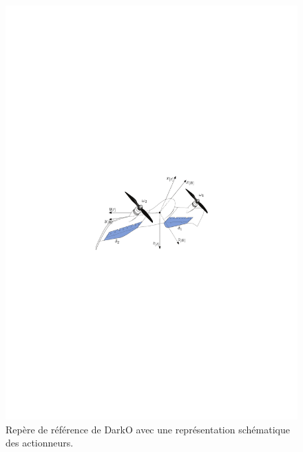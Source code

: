\begin{figure}[ht]
    \centering
    \includegraphics[width=1\columnwidth]{figures/darko.pdf}
    \caption{Repère de référence de DarkO avec une représentation schématique des actionneurs.}
    \label{fig:darko2}
\end{figure}

